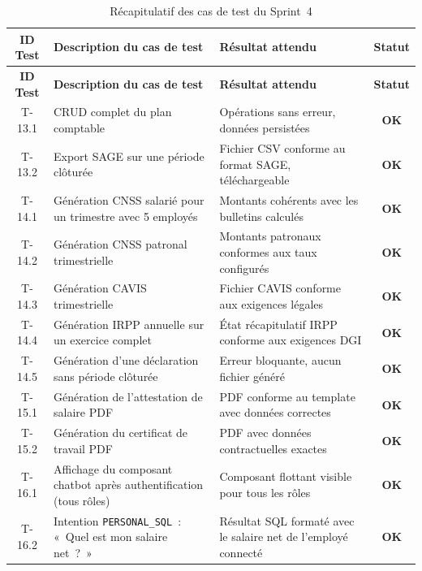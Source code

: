 \renewcommand{\arraystretch}{1.3}
\begin{longtable}{|c|p{7.5cm}|p{4.5cm}|c|}
\caption{Récapitulatif des cas de test du Sprint~4}
\label{tab:tests-sprint4-recap} \\
\hline
\textbf{ID Test} &
\textbf{Description du cas de test} &
\textbf{Résultat attendu} &
\textbf{Statut} \\
\hline
\endfirsthead
\hline
\textbf{ID Test} &
\textbf{Description du cas de test} &
\textbf{Résultat attendu} &
\textbf{Statut} \\
\hline
\endhead
\hline
\endfoot
\hline
\endlastfoot

T-13.1 & CRUD complet du plan comptable & Opérations sans erreur, données persistées & \textcolor{green!60!black}{\textbf{OK}} \\ \hline
T-13.2 & Export SAGE sur une période clôturée & Fichier CSV conforme au format SAGE, téléchargeable & \textcolor{green!60!black}{\textbf{OK}} \\ \hline
T-14.1 & Génération CNSS salarié pour un trimestre avec 5 employés & Montants cohérents avec les bulletins calculés & \textcolor{green!60!black}{\textbf{OK}} \\ \hline
T-14.2 & Génération CNSS patronal trimestrielle & Montants patronaux conformes aux taux configurés & \textcolor{green!60!black}{\textbf{OK}} \\ \hline
T-14.3 & Génération CAVIS trimestrielle & Fichier CAVIS conforme aux exigences légales & \textcolor{green!60!black}{\textbf{OK}} \\ \hline
T-14.4 & Génération IRPP annuelle sur un exercice complet & État récapitulatif IRPP conforme aux exigences DGI & \textcolor{green!60!black}{\textbf{OK}} \\ \hline
T-14.5 & Génération d'une déclaration sans période clôturée & Erreur bloquante, aucun fichier généré & \textcolor{green!60!black}{\textbf{OK}} \\ \hline
T-15.1 & Génération de l'attestation de salaire PDF & PDF conforme au template avec données correctes & \textcolor{green!60!black}{\textbf{OK}} \\ \hline
T-15.2 & Génération du certificat de travail PDF & PDF avec données contractuelles exactes & \textcolor{green!60!black}{\textbf{OK}} \\ \hline
T-16.1 & Affichage du composant chatbot après authentification (tous rôles) & Composant flottant visible pour tous les rôles & \textcolor{green!60!black}{\textbf{OK}} \\ \hline
T-16.2 & Intention \texttt{PERSONAL\_SQL}~: «~Quel est mon salaire net~?~» & Résultat SQL formaté avec le salaire net de l'employé connecté & \textcolor{green!60!black}{\textbf{OK}} \\ \hline

\end{longtable}
